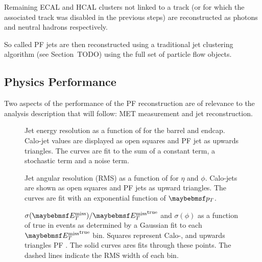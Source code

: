 Remaining \ac{ECAL} and \ac{HCAL} clusters not linked to a track (or for which
the associated track was disabled in the previous steps) are reconstructed as
photons and neutral hadrons respectively.

So called \ac{PF} jets are then reconstructed using a traditional jet clustering
algorithm (see Section~TODO) using the full set of particle flow objects.

\subsection{Physics Performance}
Two aspects of the performance of the \ac{PF} reconstruction are of relevance to
the analysis description that will follow: \acl{MET} measurement and jet
reconstruction.


\begin{figure}
\centering
{}\quad
{}\quad
\caption[Jet energy resolution as a function of \Pt]{Jet energy resolution as a
  function of \Pt for the  barrel and
   endcap. Calo-jet values are
  displayed as open squares and \ac{PF} jet as upwards triangles. The curves are
  fit to the sum of a constant term, a stochastic term and a noise term.}
\label{fig:reco_pf_jet_energyres}
\end{figure}

\begin{figure}
\centering
{}\quad
{}\quad
\caption[Jet angular resolution (\ac{RMS}) as a function of \Pt]{Jet angular
  resolution (\ac{RMS}) as a function of \Pt for 
  $\eta$ and  $\phi$. Calo-jets are shown as open
  squares and \ac{PF} jets as upward triangles. The curves are fit with an
  exponential function of $\Pt$.}
\label{fig:reco_pf_jet_angulares}
\end{figure}

\begin{figure}
\centering
{}\quad
{}\quad
\caption[\MET Resolution]{$\sigma(\MET)/\MET^{\textrm{true}}$ and
   $\sigma(\phi)$ as a function of true \MET in
  \ttbar events as determined by a Gaussian fit to each $\MET^{\textrm{true}}$
  bin. Squares represent Calo-\MET, and upwards triangles \ac{PF} \MET. The
  solid curves ares fits through these points. The dashed lines indicate the
  \ac{RMS} width of each bin.}
 \label{fig:reco_pf_met_res}
\end{figure}
